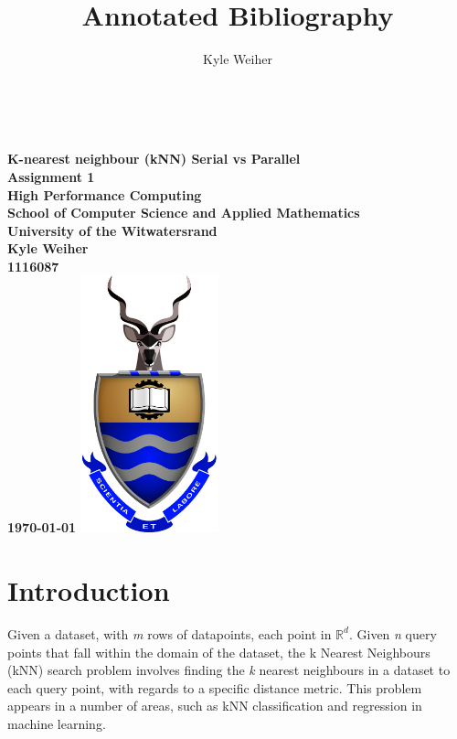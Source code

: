 \documentclass[a4paper,twoside,11pt]{report}
\title{Annotated Bibliography}
\author{Kyle Weiher}
\begin{document}
	\onecolumn
	\thispagestyle{empty}
	
	
	\setcounter{page}{0}
	\ 
	\begin{center}
		
		{
			\Large \bf \sc K-nearest neighbour (kNN) Serial vs Parallel\\
			\large Assignment 1\\[20pt]
			\large High Performance Computing\\[20pt]
			\large School of Computer Science and Applied Mathematics\\
			\large University of the Witwatersrand\\[20pt]
			\normalsize
			Kyle Weiher\\
			1116087\\[20pt]
			\today
		}
		\vfill
		\includegraphics[width=4cm]{images/wits}
		\vfill
		
		\vfill
	\end{center}
\vfill
\newpage
\thispagestyle{plain}

\section*{Introduction}
Given a dataset, with \textit{m} rows of datapoints, each point in $\mathbb{R}^d$. Given \textit{n} query points that fall within the domain of the dataset, the k Nearest Neighbours (kNN) search problem involves finding the \textit{k} nearest neighbours in a dataset to each query point, with regards to a specific distance metric. This problem appears in a number of areas, such as kNN classification and regression in machine learning.
\end{document}
